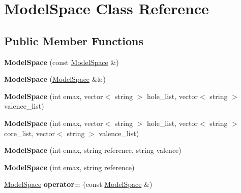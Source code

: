 \hypertarget{classModelSpace}{}\section{Model\+Space Class Reference}
\label{classModelSpace}
\subsection*{Public Member Functions}
\begin{DoxyCompactItemize}
\item 
{\bfseries Model\+Space} (const \hyperlink{classModelSpace}{Model\+Space} \&)\hypertarget{classModelSpace_a9554b9bc74b82e392fafc9de496fce5f}{}\label{classModelSpace_a9554b9bc74b82e392fafc9de496fce5f}

\item 
{\bfseries Model\+Space} (\hyperlink{classModelSpace}{Model\+Space} \&\&)\hypertarget{classModelSpace_a6fe287e59b9aca7719a553f7dedcd2d7}{}\label{classModelSpace_a6fe287e59b9aca7719a553f7dedcd2d7}

\item 
{\bfseries Model\+Space} (int emax, vector$<$ string $>$ hole\+\_\+list, vector$<$ string $>$ valence\+\_\+list)\hypertarget{classModelSpace_a39de1b598b6cf5e7301cdaa23353a60d}{}\label{classModelSpace_a39de1b598b6cf5e7301cdaa23353a60d}

\item 
{\bfseries Model\+Space} (int emax, vector$<$ string $>$ hole\+\_\+list, vector$<$ string $>$ core\+\_\+list, vector$<$ string $>$ valence\+\_\+list)\hypertarget{classModelSpace_a4550c470aa68014a31d6b2ceb2a8faec}{}\label{classModelSpace_a4550c470aa68014a31d6b2ceb2a8faec}

\item 
{\bfseries Model\+Space} (int emax, string reference, string valence)\hypertarget{classModelSpace_a5e44f5fdbd233c7291ed30377ecda92e}{}\label{classModelSpace_a5e44f5fdbd233c7291ed30377ecda92e}

\item 
{\bfseries Model\+Space} (int emax, string reference)\hypertarget{classModelSpace_ab8ce6e665c3ec88c0fa28122cc43a8e6}{}\label{classModelSpace_ab8ce6e665c3ec88c0fa28122cc43a8e6}

\item 
\hyperlink{classModelSpace}{Model\+Space} {\bfseries operator=} (const \hyperlink{classModelSpace}{Model\+Space} \&)\hypertarget{classModelSpace_a2b01062b499979b919b7b77b04745cbe}{}\label{classModelSpace_a2b01062b499979b919b7b77b04745cbe}


\end{DoxyCompactItemize}
